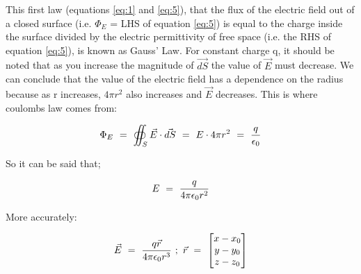 \documentclass{article}
\begin{document}
This first law (equations \ref{eq:1} and \ref{eq:5}), that the flux of the electric field out of a closed surface (i.e. \begin{math} \Phi_E \end{math} = LHS of equation \ref{eq:5}) is equal to the charge inside the surface divided by the electric permittivity of free space (i.e. the RHS of equation \ref{eq:5}), is known as Gauss' Law. For constant charge q, it should be noted that as you increase the magnitude of \begin{math} \vec{dS} \end{math} the value of \begin{math} \vec{E} \end{math} must decrease. We can conclude that the value of the electric field has a dependence on the radius because as r increases, \begin{math} 4\pi r^2 \end{math} also increases and \begin{math} \vec{E} \end{math} decreases. This is where coulombs law comes from:

\begin{equation} \label{eq:9}
\Phi_E \hspace{0.125cm} = \hspace{0.125cm} \oiint_S \vec{E}\cdot\vec{dS} \hspace{0.125cm} = \hspace{0.125cm} E \cdot 4\pi r^2  \hspace{0.125cm} =  \hspace{0.125cm} \frac{q}{\epsilon_0}
\end{equation}

So it can be said that;

\begin{equation} \label{eq:10}
E \hspace{0.125cm} = \hspace{0.125cm} \frac{q}{4\pi \epsilon_0 r^2}
\end{equation}

More accurately:

\begin{equation} \label{eq:11}
\vec{E} \hspace{0.125cm} = \hspace{0.125cm} \frac{q \vec{r}}{4\pi \epsilon_0 r^3} \hspace{0.125cm} ; \hspace{0.125cm} \vec{r}  \hspace{0.125cm} =  \hspace{0.125cm} \begin{bmatrix} x -  x_0 \\ y - y_0 \\ z - z_0 \end{bmatrix}
\end{equation}
\end{document}
